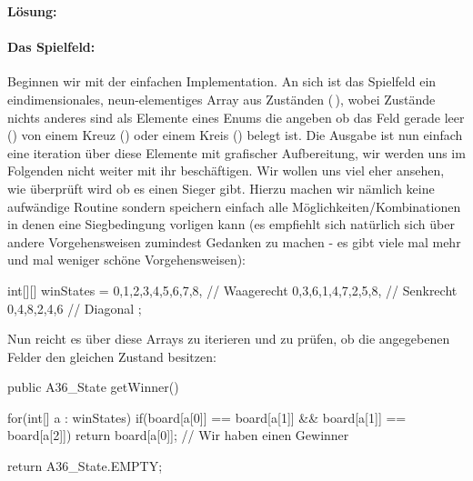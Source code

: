\documentclass[table]{sopra-base}
\makeatletter
\newenvironment{solution}{\null\par\noindent\textbf{\textcolor{sob@col@uulm@cs}{Lösung:}}\newline\bgroup\color{black}\slshape\ignorespaces}{\egroup}
\makeatother
\begin{document}
\begin{solution}
    \paragraph{Das Spielfeld:}
    Beginnen wir mit der einfachen Implementation. An sich ist das Spielfeld ein eindimensionales, neun-elementiges Array aus Zuständen (\,), wobei Zustände nichts anderes sind als Elemente eines Enums die angeben ob das Feld gerade leer () von einem Kreuz () oder einem Kreis () belegt ist. Die Ausgabe ist nun einfach eine iteration über diese Elemente mit grafischer Aufbereitung, wir werden uns im Folgenden nicht weiter mit ihr beschäftigen. Wir wollen uns viel eher ansehen, wie überprüft wird ob es einen Sieger gibt. Hierzu machen wir nämlich keine aufwändige Routine sondern speichern einfach alle Möglichkeiten/Kombinationen in denen eine Siegbedingung vorligen kann (es empfiehlt sich natürlich sich über andere Vorgehensweisen zumindest Gedanken zu machen - es gibt viele mal mehr und mal weniger schöne Vorgehensweisen):
\begin{java*}
int[][] winStates = {{0,1,2},{3,4,5},{6,7,8}, // Waagerecht
                     {0,3,6},{1,4,7},{2,5,8}, // Senkrecht
                     {0,4,8},{2,4,6} // Diagonal
                    };
\end{java*}
    Nun reicht es über diese Arrays zu iterieren und zu prüfen, ob die angegebenen Felder den gleichen Zustand besitzen:
\bgroup
{}
\begin{java}[firstnumber=68]
public A36_State getWinner(){
    for(int[] a : winStates)
        if(board[a[0]] == board[a[1]] && board[a[1]] == board[a[2]])
            return board[a[0]]; // Wir haben einen Gewinner

    return A36_State.EMPTY;
}
\end{java}

\end{solution}
\end{document}
